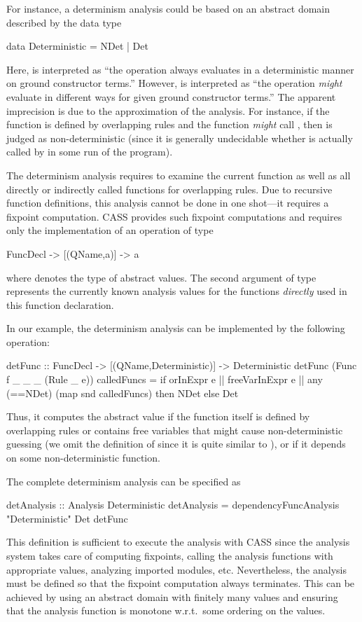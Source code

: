 For instance, a determinism analysis could be based
on an abstract domain described by the data type
\begin{curry}
data Deterministic = NDet | Det
\end{curry}
Here,  is interpreted as ``the operation always evaluates
in a deterministic manner on ground constructor terms.''
However,  is interpreted as ``the operation \emph{might}
evaluate in different ways for given ground constructor terms.''
The apparent imprecision is due to the approximation of the analysis.
For instance, if the function  is defined by overlapping rules
and the function  \emph{might} call , then 
is judged as non-deterministic (since it is generally undecidable
whether  is actually called by  in some run of the
program).

The determinism analysis requires to examine the current
function as well as all directly or indirectly called functions
for overlapping rules.
Due to recursive function definitions, this analysis cannot be done
in one shot---it requires a fixpoint computation.
CASS provides such fixpoint computations and requires
only the implementation of an operation of type
\begin{curry}
FuncDecl -> [(QName,a)] -> a
\end{curry}
where  denotes the type of abstract values.
The second argument of type \code{[(QName,a)]}
represents the currently known analysis values
for the functions \emph{directly} used in this function declaration.

In our example, the determinism analysis can be implemented
by the following operation:
\begin{curry}
detFunc :: FuncDecl -> [(QName,Deterministic)] -> Deterministic
detFunc (Func f _ _ _ (Rule _ e)) calledFuncs =
  if orInExpr e || freeVarInExpr e || any (==NDet) (map snd calledFuncs)
    then NDet
    else Det
\end{curry}
Thus, it computes the abstract value 
if the function itself is defined by overlapping rules or
contains free variables that might cause non-deterministic guessing
(we omit the definition of  since it is quite
similar to ), or
if it depends on some non-deterministic function.

The complete determinism analysis can be specified as
\begin{curry}
detAnalysis :: Analysis Deterministic
detAnalysis = dependencyFuncAnalysis "Deterministic" Det detFunc
\end{curry}
This definition is sufficient to execute the analysis
with CASS since the analysis system takes care of computing fixpoints,
calling the analysis functions with appropriate values,
analyzing imported modules, etc.
Nevertheless, the analysis must be defined so that the fixpoint
computation always terminates. This can be achieved by using
an abstract domain with finitely many values and ensuring
that the analysis function is monotone w.r.t.\ some ordering on the values.
